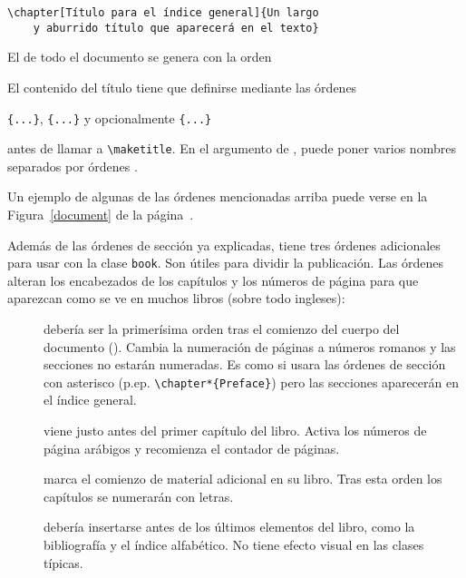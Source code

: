 \begin{code}
    \verb|\chapter[Título para el índice general]{Un largo|\\
    \verb|    y aburrido título que aparecerá en el texto}|
\end{code} 

El  de todo el documento se genera con la orden
\begin{lscommand}
\end{lscommand}
El contenido del título tiene que definirse mediante las órdenes
\begin{lscommand}
\verb|{...}|, \verb|{...}| 
y opcionalmente \verb|{...}| 
\end{lscommand}
antes de llamar a \verb|\maketitle|.  En el argumento de , puede poner varios nombres separados por órdenes . 

Un ejemplo de algunas de las órdenes mencionadas arriba puede verse en la Figura~\ref{document} de la página~\pageref{document}.

Además de las órdenes de sección ya explicadas, \LaTeXe{} tiene tres órdenes adicionales para usar con la clase \verb|book|.  Son útiles para dividir la publicación.  Las órdenes alteran los encabezados de los capítulos y los números de página para que aparezcan como se ve en muchos libros (sobre todo ingleses):
\begin{description}
    \item[] debería ser la primerísima orden tras el comienzo del cuerpo del documento (\verb||).  Cambia la numeración de páginas a números romanos y las secciones no estarán numeradas.  Es como si usara las órdenes de sección con asterisco (p.ep.{} \verb|\chapter*{Preface}|) pero las secciones aparecerán en el índice general.
    \item[] viene justo antes del primer capítulo del libro.  Activa los números de página arábigos y recomienza el contador de páginas.
    \item[] marca el comienzo de material adicional en su libro.  Tras esta orden los capítulos se numerarán con letras. 
    \item[] debería insertarse antes de los últimos elementos del libro, como la bibliografía y el índice alfabético. No tiene efecto visual en las clases típicas. 
\end{description}


